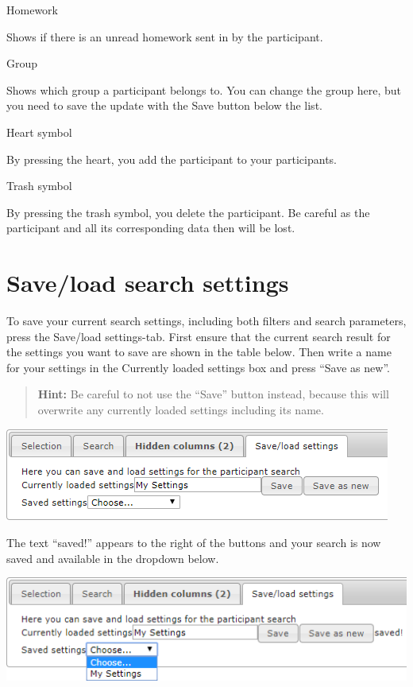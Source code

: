 \documentclass[
]{book}
\begin{document}
Homework

Shows if there is an unread homework sent in by the participant.

Group

Shows which group a participant belongs to. You can change the group here, but you need to save the update with the Save button below the list.

Heart symbol

By pressing the heart, you add the participant to your participants.

Trash symbol

By pressing the trash symbol, you delete the participant. Be careful as the participant and all its corresponding data then will be lost.

\section{Save/load search settings}\label{saveload-search-settings}

To save your current search settings, including both filters and search parameters, press the Save/load settings-tab. First ensure that the current search result for the settings you want to save are shown in the table below. Then write a name for your settings in the Currently loaded settings box and press ``Save as new''.

\begin{quote}
\textbf{Hint:} Be careful to not use the ``Save'' button instead, because this will overwrite any currently loaded settings including its name.
\end{quote}

\includegraphics{images/save-load1.png}

The text ``saved!'' appears to the right of the buttons and your search is now saved and available in the dropdown below.

\includegraphics{images/save-load2.png}
\end{document}
